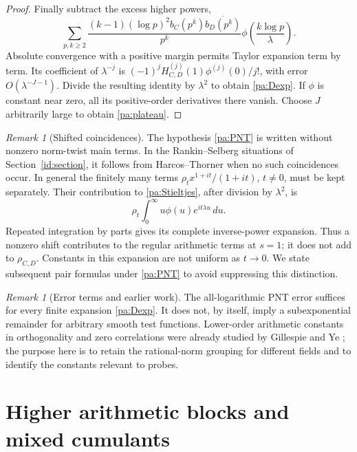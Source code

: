 \documentclass[11pt,reqno]{amsart}
\numberwithin{equation}{section}
\theoremstyle{definition}
\theoremstyle{remark}
\newtheorem{remark}[theorem]{Remark}
\begin{document}
\begin{proof}
Finally subtract the excess higher powers,
\begin{equation}\sum_{p,k\ge2}\frac{(k-1)(\log p)^2b_C(p^k)\overline{b_D(p^k)}}{p^k}
\phi\left(\frac{k\log p}{\lambda}\right).\label{pa:Hweight}\end{equation}
Absolute convergence with a positive margin permits Taylor expansion term by term. Its coefficient of $\lambda^{-j}$ is
$(-1)^jH_{C,D}^{(j)}(1)\phi^{(j)}(0)/j!$, with error $O(\lambda^{-J-1})$. Divide the resulting identity by $\lambda^2$ to obtain \eqref{pa:Dexp}. If $\phi$ is constant near zero, all its positive-order derivatives there vanish. Choose $J$ arbitrarily large to obtain \eqref{pa:plateau}.
\end{proof}

\begin{remark}[Shifted coincidences]
The hypothesis \eqref{pa:PNT} is written without nonzero norm-twist main terms. In the Rankin--Selberg situations of Section~\ref{id:section}, it follows from Harcos--Thorner when no such coincidences occur. In general the finitely many terms $\rho_t x^{1+it}/(1+it)$, $t\ne0$, must be kept separately. Their contribution to \eqref{pa:Stieltjes}, after division by $\lambda^2$, is
\[
\rho_t\int_0^\infty u\phi(u)e^{it\lambda u}\,du.
\]
Repeated integration by parts gives its complete inverse-power expansion. Thus a nonzero shift contributes to the regular arithmetic terms at $s=1$; it does not add to $\rho_{C,D}$. Constants in this expansion are not uniform as $t\to0$. We state subsequent pair formulas under \eqref{pa:PNT} to avoid suppressing this distinction.
\end{remark}

\begin{remark}[Error terms and earlier work]
The all-logarithmic PNT error suffices for every finite expansion \eqref{pa:Dexp}. It does not, by itself, imply a subexponential remainder for arbitrary smooth test functions. Lower-order arithmetic constants in orthogonality and zero correlations were already studied by Gillespie and Ye \cite{GY2014,GY2016}; the purpose here is to retain the rational-norm grouping for different fields and to identify the constants relevant to probes.
\end{remark}


\section{Higher arithmetic blocks and mixed cumulants}\label{hi:section}
\end{document}

